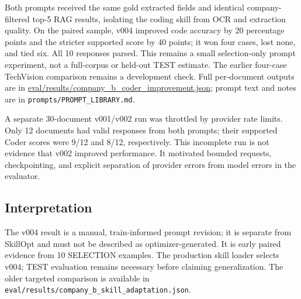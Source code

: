 Both prompts received the same gold extracted fields and identical
company-filtered top-5 RAG results, isolating the coding skill from OCR and
extraction quality. On the paired sample, v004 improved code accuracy by 20
percentage points and the stricter supported score by 40 points; it won four
cases, lost none, and tied six. All 10 responses parsed. This remains a small
selection-only prompt experiment, not a full-corpus or held-out TEST estimate.
The earlier four-case TechVision comparison remains a development check. Full
per-document outputs are in
\url{eval/results/company_b_coder_improvement.json}; prompt text and notes are
in \texttt{prompts/PROMPT\_LIBRARY.md}.

A separate 30-document v001/v002 run was throttled by provider rate limits. Only
12 documents had valid responses from both prompts; their supported Coder
scores were 9/12 and 8/12, respectively. This incomplete run is not evidence
that v002 improved performance. It motivated bounded requests, checkpointing,
and explicit separation of provider errors from model errors in the evaluator.

\subsection{Interpretation}

The v004 result is a manual, train-informed prompt revision; it is separate
from SkillOpt and must not be described as optimizer-generated. It is early
paired evidence from 10 SELECTION examples. The production skill loader selects
v004; TEST evaluation remains necessary before claiming generalization. The
older targeted comparison is available in
\texttt{eval/results/company\_b\_skill\_adaptation.json}.
